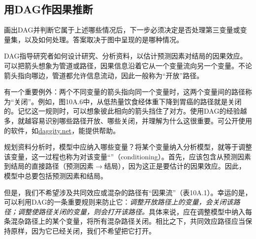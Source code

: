\subsection{用DAG作因果推断}
画出DAG并判断它属于上述哪些情况后，下一步必须决定是否处理第三变量或变量集，以及如何处理。答案取决于图中呈现的是哪种情况。

DAG指导研究者如何设计研究、分析资料，以估计预测因素对结局的因果效应。可以把箭头想象为管道或路径，因果信息沿着它从一个变量流向另一个变量。不论箭头指向哪边，管道都允许信息流动，因此一般称为“开放”路径。

有一个重要例外：两个不同变量的箭头指向同一个变量时，这两个变量间的路径称为“关闭”。例如，图10A.6中，从低热量饮食经体重下降到胃癌的路径就是关闭的。记忆这一规则时，可以想象彼此相向的箭头挡住了对方。使用DAG的经验越多，就越容易识别哪些路径开放、哪些关闭，并理解为什么这很重要。可公开使用的软件，如\url{daggity.net}，能提供帮助。

规划资料分析时，模型中应纳入哪些变量？将某个变量纳入分析模型，就等于调整该变量，这一过程也称为对该变量“”（conditioning）。首先，应该包含从预测因素到结局的直接路径（预测因素$\to$结局），因为这正是要估计的因果效应。因此，模型中总要包括预测因素和结局。

但是，我们不希望涉及共同效应或混杂的路径有“因果流”（表10A.1）。幸运的是，可以利用DAG的一条重要规则来防止它：\emph{调整开放路径上的变量，会关闭该路径；调整使路径关闭的变量，则会打开该路径。}具体来说，应在调整模型中纳入每条混杂路径上的某个变量，将所有混杂路径关闭。相比之下，共同效应路径应当保持原样，因为它已经关闭，我们不希望把它打开。

